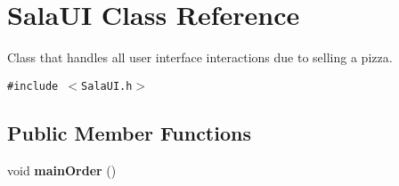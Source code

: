 \hypertarget{class_sala_u_i}{
\section{Sala\-UI Class Reference}
\label{class_sala_u_i}
}
Class that handles all user interface interactions due to selling a pizza.  


{\tt \#include $<$Sala\-UI.h$>$}

\subsection*{Public Member Functions}
\begin{CompactItemize}
\item 
\hypertarget{class_sala_u_i_d30e21f7319d652c2a2fd88dc274cfbc}{
void {\bf main\-Order} ()}
\label{class_sala_u_i_d30e21f7319d652c2a2fd88dc274cfbc}

\end{CompactItemize}
